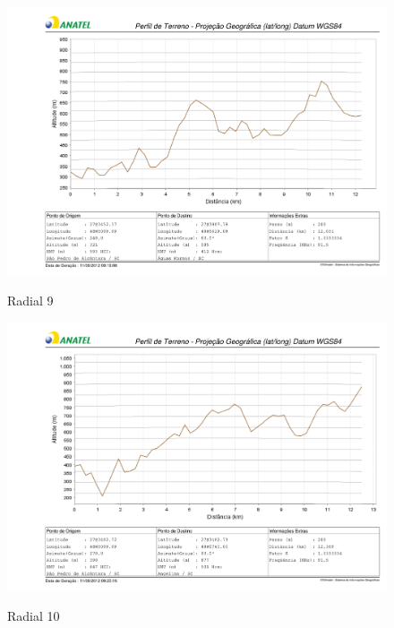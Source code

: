 \begin{figure}[ht] %
\begin{center}
\includegraphics[scale=.5]{./figuras/nmt9_v2.pdf} %

Radial 9
\end{center}
\label{nmt9}
\end{figure}

\begin{figure}[ht] %
\begin{center}
\includegraphics[scale=.5]{./figuras/nmt10_v2.pdf} %

Radial 10
\end{center}
\label{nmt10}
\end{figure}

